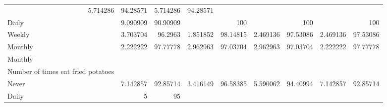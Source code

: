 \documentclass{article}
\begin{document}
\begin{table}[!h]
{\begin{tabular}{lllllllll}
				\multicolumn{1}{r}{5.714286} &
				\multicolumn{1}{r}{94.28571} &
				\multicolumn{1}{r}{5.714286} &
				\multicolumn{1}{r}{94.28571} \\
				\multicolumn{1}{l}{\hspace{5em}Daily} &
				\multicolumn{1}{|r}{9.090909} &
				\multicolumn{1}{r}{90.90909} &
				\multicolumn{1}{r}{} &
				\multicolumn{1}{r}{100} &
				\multicolumn{1}{r}{} &
				\multicolumn{1}{r}{100} &
				\multicolumn{1}{r}{} &
				\multicolumn{1}{r}{100} \\
				\multicolumn{1}{l}{\hspace{5em}Weekly} &
				\multicolumn{1}{|r}{3.703704} &
				\multicolumn{1}{r}{96.2963} &
				\multicolumn{1}{r}{1.851852} &
				\multicolumn{1}{r}{98.14815} &
				\multicolumn{1}{r}{2.469136} &
				\multicolumn{1}{r}{97.53086} &
				\multicolumn{1}{r}{2.469136} &
				\multicolumn{1}{r}{97.53086} \\
				\multicolumn{1}{l}{\hspace{5em}Monthly} &
				\multicolumn{1}{|r}{2.222222} &
				\multicolumn{1}{r}{97.77778} &
				\multicolumn{1}{r}{2.962963} &
				\multicolumn{1}{r}{97.03704} &
				\multicolumn{1}{r}{2.962963} &
				\multicolumn{1}{r}{97.03704} &
				\multicolumn{1}{r}{2.222222} &
				\multicolumn{1}{r}{97.77778} \\
				\multicolumn{1}{l}{\hspace{3em}Monthly} &
				\multicolumn{1}{|r}{} &
				\multicolumn{1}{r}{} &
				\multicolumn{1}{r}{} &
				\multicolumn{1}{r}{} &
				\multicolumn{1}{r}{} &
				\multicolumn{1}{r}{} &
				\multicolumn{1}{r}{} &
				\multicolumn{1}{r}{} \\
				\multicolumn{1}{l}{\hspace{4em}Number of times eat fried potatoes} &
				\multicolumn{1}{|r}{} &
				\multicolumn{1}{r}{} &
				\multicolumn{1}{r}{} &
				\multicolumn{1}{r}{} &
				\multicolumn{1}{r}{} &
				\multicolumn{1}{r}{} &
				\multicolumn{1}{r}{} &
				\multicolumn{1}{r}{} \\
				\multicolumn{1}{l}{\hspace{5em}Never} &
				\multicolumn{1}{|r}{7.142857} &
				\multicolumn{1}{r}{92.85714} &
				\multicolumn{1}{r}{3.416149} &
				\multicolumn{1}{r}{96.58385} &
				\multicolumn{1}{r}{5.590062} &
				\multicolumn{1}{r}{94.40994} &
				\multicolumn{1}{r}{7.142857} &
				\multicolumn{1}{r}{92.85714} \\
				\multicolumn{1}{l}{\hspace{5em}Daily} &
				\multicolumn{1}{|r}{5} &
				\multicolumn{1}{r}{95} &

\end{tabular}}
\end{table}
\end{document}
